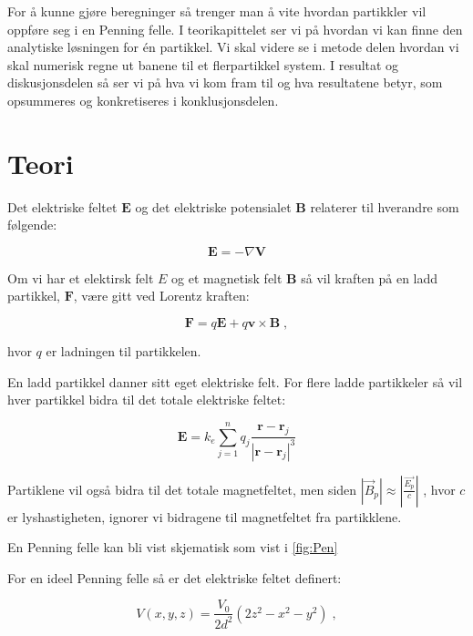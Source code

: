 \documentclass[reprint,english,notitlepage, nofootinbib]{revtex4-1}  %
\begin{document}
For å kunne gjøre beregninger så trenger man å vite hvordan partikkler vil oppføre seg i en Penning felle. I teorikapittelet ser vi på hvordan vi kan finne den analytiske løsningen for én partikkel. Vi skal videre se i metode delen hvordan vi skal numerisk regne ut banene til et flerpartikkel system. I resultat og diskusjonsdelen så ser vi på hva vi kom fram til og hva resultatene betyr, som opsummeres og konkretiseres i konklusjonsdelen.

\section{Teori}   %
Det elektriske feltet $\mathbf{E}$ og det elektriske potensialet $\mathbf{B}$ relaterer til hverandre som følgende:

\begin{equation}\label{E}
\mathbf{E} = - \nabla{\mathbf{V}}
\end{equation}

Om vi har et elektirsk felt $E$ og et magnetisk felt $\mathbf{B}$ så vil kraften på en ladd partikkel, $\mathbf{F}$, være gitt ved Lorentz kraften:

\begin{equation}\label{F}
\mathbf{F} = q\mathbf{E} + q\mathbf{v}\times \mathbf{B} \; ,
\end{equation}

hvor $q$ er ladningen til partikkelen. 

En ladd partikkel danner sitt eget elektriske felt. For flere ladde partikkeler så vil hver partikkel bidra til det totale elektriske feltet:

\begin{equation}\label{Esum}
\mathbf{E} = k_e \sum_{j=1}^{n} q_j \frac{\mathbf{r} - \mathbf{r}_j}{\left | \mathbf{r} - \mathbf{r}_j \right |^3} 
\end{equation}

Partiklene vil også bidra til det totale magnetfeltet, men siden \tiny{${\left |\vec{B}_p \right | \approx \left | \frac{\vec{E_p}}{c} \right |}$} \normalsize{}, hvor $c$ er lyshastigheten, ignorer vi bidragene til magnetfeltet fra partikklene.   

En Penning felle kan bli vist skjematisk som vist i \autoref{fig:Pen}

For en ideel Penning felle så er det elektriske feltet definert:

\begin{equation}\label{V}
V(x,y,z) = \frac{V_0}{2d^2}\left (2z^2 - x^2 -y^2 \right ) \; ,
\end{equation}
\end{document}
